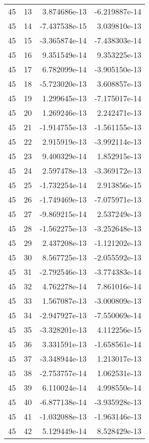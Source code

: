 \begin{tabular}{rrrr}
  45 &   13 &  3.874686e-13 & -6.219887e-14 \\
  45 &   14 & -7.437538e-15 &  3.039810e-13 \\
  45 &   15 & -3.365874e-14 & -7.438303e-14 \\
  45 &   16 &  9.351549e-14 &  9.353225e-13 \\
  45 &   17 &  6.782099e-14 & -3.905150e-13 \\
  45 &   18 & -5.723020e-13 &  3.608857e-13 \\
  45 &   19 &  1.299645e-13 & -7.175017e-14 \\
  45 &   20 &  1.269246e-13 &  2.242471e-13 \\
  45 &   21 & -1.914755e-13 & -1.561155e-13 \\
  45 &   22 &  2.915919e-13 & -3.992114e-13 \\
  45 &   23 &  9.400329e-14 &  1.852915e-13 \\
  45 &   24 &  2.597478e-13 & -3.369172e-13 \\
  45 &   25 & -1.732254e-14 &  2.913856e-15 \\
  45 &   26 & -1.749469e-13 & -7.075971e-13 \\
  45 &   27 & -9.869215e-14 &  2.537249e-13 \\
  45 &   28 & -1.562275e-13 & -3.252648e-13 \\
  45 &   29 &  2.437208e-13 & -1.121202e-13 \\
  45 &   30 &  8.567725e-13 & -2.055592e-13 \\
  45 &   31 & -2.792546e-13 & -3.774383e-14 \\
  45 &   32 &  4.762278e-14 &  7.861016e-14 \\
  45 &   33 &  1.567087e-13 & -3.000809e-13 \\
  45 &   34 & -2.947927e-13 & -7.550069e-14 \\
  45 &   35 & -3.328201e-13 &  4.112256e-15 \\
  45 &   36 &  3.331591e-13 & -1.658561e-14 \\
  45 &   37 & -3.348944e-13 &  1.213017e-13 \\
  45 &   38 & -2.753757e-14 &  1.062531e-13 \\
  45 &   39 &  6.110024e-14 &  4.998550e-14 \\
  45 &   40 & -6.877138e-14 & -3.935928e-13 \\
  45 &   41 & -1.032088e-13 & -1.963146e-13 \\
  45 &   42 &  5.129449e-14 &  8.528429e-13 \\

\end{tabular}
